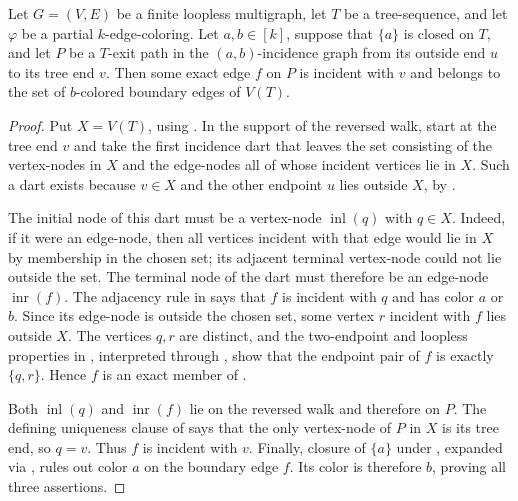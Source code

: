 \begin{helper}
Let $G=(V,E)$ be a finite loopless multigraph, let $T$ be a
tree-sequence, and let $\varphi$ be a partial $k$-edge-coloring.  Let
$a,b\in[k]$, suppose that $\{a\}$ is closed on $T$, and let $P$ be a
$T$-exit path in the $(a,b)$-incidence graph from its outside end $u$ to
its tree end $v$.  Then some exact edge $f$ on $P$ is incident with $v$
and belongs to the set of $b$-colored boundary edges of $V(T)$.
\end{helper}
\begin{proof}
Put $X=V(T)$, using .  In the support of
the reversed walk, start at the tree end $v$ and take the first incidence
dart that leaves the set consisting of the vertex-nodes in $X$ and the
edge-nodes all of whose incident vertices lie in $X$.  Such a dart exists
because $v\in X$ and the other endpoint $u$ lies outside $X$, by
.

The initial node of this dart must be a vertex-node
$\operatorname{inl}(q)$ with $q\in X$.  Indeed, if it were an edge-node,
then all vertices incident with that edge would lie in $X$ by membership
in the chosen set; its adjacent terminal vertex-node could not lie
outside the set.  The terminal node of the dart must therefore be an
edge-node $\operatorname{inr}(f)$.  The adjacency rule in
 says that $f$ is incident with $q$ and
has color $a$ or $b$.  Since its edge-node is outside the chosen set,
some vertex $r$ incident with $f$ lies outside $X$.  The vertices $q,r$
are distinct, and the two-endpoint and loopless properties in
, interpreted through ,
show that the endpoint pair of $f$ is exactly $\{q,r\}$.  Hence $f$ is an
exact member of .

Both $\operatorname{inl}(q)$ and $\operatorname{inr}(f)$ lie on the
reversed walk and therefore on $P$.  The defining uniqueness clause of
 says that the only vertex-node of $P$ in $X$ is
its tree end, so $q=v$.  Thus $f$ is incident with $v$.  Finally, closure
of $\{a\}$ under , expanded via
, rules out color $a$ on the boundary edge
$f$.  Its color is therefore $b$, proving all three assertions.
\end{proof}
